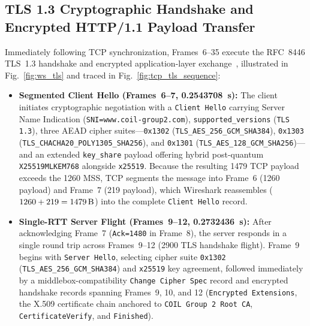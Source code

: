 \subsection{TLS 1.3 Cryptographic Handshake and Encrypted HTTP/1.1 Payload Transfer}
\label{subsec:ws_tls}

Immediately following TCP synchronization, Frames~6--35 execute the RFC~8446 TLS~1.3 handshake and encrypted application-layer exchange~\cite{rfc8446}, illustrated in Fig.~\ref{fig:ws_tls} and traced in Fig.~\ref{fig:tcp_tls_sequence}:
\begin{itemize}
    \item \textbf{Segmented Client Hello (Frames~6--7, \qty{0.2543708}{\second}):} The client initiates cryptographic negotiation with a \texttt{Client Hello} carrying Server Name Indication (\texttt{SNI=www.coil-group2.com}), \texttt{supported\_versions} (\texttt{TLS 1.3}), three AEAD cipher suites---\texttt{0x1302} (\nolinkurl{TLS_AES_256_GCM_SHA384}), \texttt{0x1303} (\nolinkurl{TLS_CHACHA20_POLY1305_SHA256}), and \texttt{0x1301} (\nolinkurl{TLS_AES_128_GCM_SHA256})---and an extended \texttt{key\_share} payload offering hybrid post-quantum \texttt{X25519MLKEM768} alongside \texttt{x25519}. Because the resulting \qty{1479}{\byte} TCP payload exceeds the \qty{1260}{\byte} MSS, TCP segments the message into Frame~6 (\qty{1260}{\byte} payload) and Frame~7 (\qty{219}{\byte} payload), which Wireshark reassembles ($1260 + 219 = \qty{1479}{\byte}$) into the complete \texttt{Client Hello} record.
    \item \textbf{Single-RTT Server Flight (Frames~9--12, \qty{0.2732436}{\second}):} After acknowledging Frame~7 (\texttt{Ack=1480} in Frame~8), the server responds in a single round trip across Frames~9--12 (\qty{2900}{\byte} TLS handshake flight). Frame~9 begins with \texttt{Server Hello}, selecting cipher suite \texttt{0x1302} (\nolinkurl{TLS_AES_256_GCM_SHA384}) and \texttt{x25519} key agreement, followed immediately by a middlebox-compatibility \texttt{Change Cipher Spec} record and encrypted handshake records spanning Frames~9, 10, and 12 (\texttt{Encrypted Extensions}, the X.509 certificate chain anchored to \texttt{COIL Group 2 Root CA}, \texttt{CertificateVerify}, and \texttt{Finished}).

\end{itemize}

